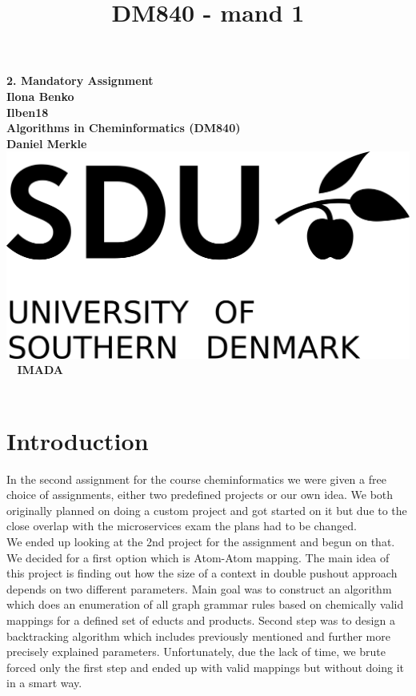 \documentclass[a4paper,10pt,titlepage]{report}
\date{}
\title{DM840 - mand 1}
\begin{document}
\begin{titlepage}
\centering
    \vspace*{9\baselineskip}
    \huge
    \bfseries
    2. Mandatory Assignment \\
    \normalfont
    Ilona Benko \\
  Ilben18 \\
	\huge
    Algorithms in Cheminformatics (DM840)  \\
    Daniel Merkle \\[4\baselineskip]
    \normalfont
	\includegraphics[scale=1]{SDU_logo}
    \vfill\
    \vspace{5mm}
    IMADA \\

    \textbf{\datedate}  \bf \\[2\baselineskip]
\end{titlepage}

\renewcommand{\thepage}{\roman{page}}%
\tableofcontents
\newpage
\setcounter{page}{1}
\renewcommand{\thepage}{\arabic{page}}

\section {Introduction}

In the second assignment for the course cheminformatics we were given a free choice of assignments, either two predefined projects or our own idea. We both originally planned on doing a custom project and got started on it but due to the close overlap with the microservices exam the plans had to be changed. \\

We ended up looking at the 2nd project for the assignment and begun on that. We decided for a first option which is Atom-Atom mapping. The main idea of this project is finding out how the size of a context in double pushout approach depends on two different parameters. Main goal was to construct an algorithm which does an enumeration of all graph grammar rules based on chemically valid mappings for a defined set of educts and products. Second step was to design a backtracking algorithm which includes previously mentioned and further more precisely  explained parameters. Unfortunately, due the lack of time, we brute forced only the first step and ended up with valid mappings but without doing it in a smart way. 
\end{document}
